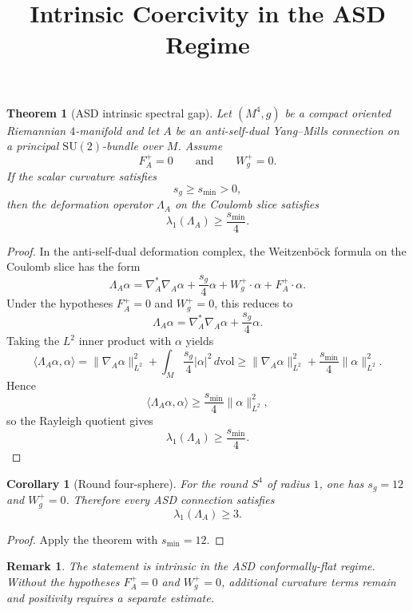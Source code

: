 \documentclass[11pt]{article}
\title{Intrinsic Coercivity in the ASD Regime}
\author{}
\date{}
\newtheorem{theorem}{Theorem}
\newtheorem{corollary}{Corollary}
\newtheorem{remark}{Remark}
\begin{document}
\maketitle

\begin{theorem}[ASD intrinsic spectral gap]
Let $(M^4,g)$ be a compact oriented Riemannian $4$-manifold and let $A$ be an anti-self-dual
Yang--Mills connection on a principal $\mathrm{SU}(2)$-bundle over $M$.
Assume
\[
F_A^+=0
\qquad\text{and}\qquad
W_g^+=0.
\]
If the scalar curvature satisfies
\[
s_g\ge s_{\min}>0,
\]
then the deformation operator $\Lambda_A$ on the Coulomb slice satisfies
\[
\lambda_1(\Lambda_A)\ge \frac{s_{\min}}{4}.
\]
\end{theorem}

\begin{proof}
In the anti-self-dual deformation complex, the Weitzenb\"ock formula on the Coulomb slice has the form
\[
\Lambda_A\alpha=\nabla_A^*\nabla_A\alpha+\frac{s_g}{4}\alpha+W_g^+\!\cdot\alpha+F_A^+\!\cdot\alpha.
\]
Under the hypotheses $F_A^+=0$ and $W_g^+=0$, this reduces to
\[
\Lambda_A\alpha=\nabla_A^*\nabla_A\alpha+\frac{s_g}{4}\alpha.
\]
Taking the $L^2$ inner product with $\alpha$ yields
\[
\langle \Lambda_A\alpha,\alpha\rangle
=
\|\nabla_A\alpha\|_{L^2}^2+\int_M \frac{s_g}{4}|\alpha|^2\,d\mathrm{vol}
\ge
\|\nabla_A\alpha\|_{L^2}^2+\frac{s_{\min}}{4}\|\alpha\|_{L^2}^2.
\]
Hence
\[
\langle \Lambda_A\alpha,\alpha\rangle\ge \frac{s_{\min}}{4}\|\alpha\|_{L^2}^2,
\]
so the Rayleigh quotient gives
\[
\lambda_1(\Lambda_A)\ge \frac{s_{\min}}{4}.
\]
\end{proof}

\begin{corollary}[Round four-sphere]
For the round $S^4$ of radius $1$, one has $s_g=12$ and $W_g^+=0$.
Therefore every ASD connection satisfies
\[
\lambda_1(\Lambda_A)\ge 3.
\]
\end{corollary}

\begin{proof}
Apply the theorem with $s_{\min}=12$.
\end{proof}

\begin{remark}
The statement is intrinsic in the ASD conformally-flat regime.
Without the hypotheses $F_A^+=0$ and $W_g^+=0$, additional curvature terms remain and positivity
requires a separate estimate.
\end{remark}
\end{document}
